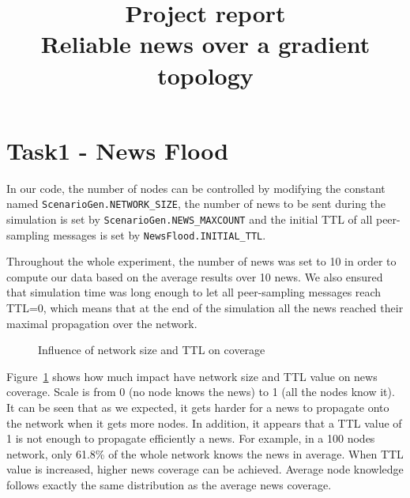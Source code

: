 \documentclass[conference]{IEEEtran}
\begin{document}
\title{Project report\\
Reliable news over a gradient topology}


\author{
\and
{}
}
\maketitle
\IEEEpeerreviewmaketitle

\section{Task1 - News Flood}
In our code, the number of nodes can be controlled by modifying the constant named \texttt{ScenarioGen.NETWORK\_SIZE}, the number of news to be sent during the simulation is set by \texttt{ScenarioGen.NEWS\_MAXCOUNT} and the initial TTL of all peer-sampling messages is set by \texttt{NewsFlood.INITIAL\_TTL}.

Throughout the whole experiment, the number of news was set to 10 in order to compute our data based on the average results over 10 news. We also ensured that simulation time was long enough to let all peer-sampling messages reach TTL=0, which means that at the end of the simulation all the news reached their maximal propagation over the network.

\begin{figure}
\caption{Influence of network size and TTL on coverage}
\label{fig:T1_coverage}
\end{figure}

Figure~\ref{fig:T1_coverage} shows how much impact have network size and TTL value on news coverage.
Scale is from 0 (no node knows the news) to 1 (all the nodes know it).
It can be seen that as we expected, it gets harder for a news to propagate onto the network when it gets more nodes.
In addition, it appears that a TTL value of 1 is not enough to propagate efficiently a news. 
For example, in a 100 nodes network, only 61.8\% of the whole network knows the news in average.
When TTL value is increased, higher news coverage can be achieved.
Average node knowledge follows exactly the same distribution as the average news coverage.
\end{document}

